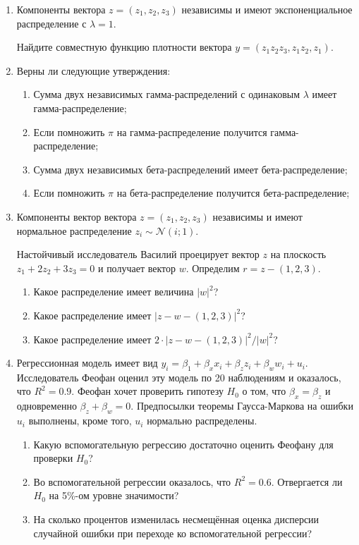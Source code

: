 \documentclass[12pt, a4paper]{article}
\def \cN{\mathcal{N}}
\begin{document}
\begin{enumerate}
\item Компоненты вектора $z= (z_1, z_2, z_3)$ независимы и имеют экспоненциальное распределение с $\lambda = 1$.

Найдите совместную функцию плотности вектора $y = (z_1z_2z_3, z_1z_2, z_1)$.

\item Верны ли следующие утверждения:

\begin{enumerate}
  \item Сумма двух независимых гамма-распределений с одинаковым $\lambda$ имеет гамма-распределение;
  \item Если помножить $\pi$ на гамма-распределение получится гамма-распределение;
  \item Сумма двух независимых бета-распределений  имеет бета-распределение;
  \item Если помножить $\pi$ на бета-распределение получится бета-распределение;
\end{enumerate}

\item Компоненты вектор вектора $z= (z_1, z_2, z_3)$ независимы и имеют нормальное распределение $z_i \sim \cN(i; 1)$.

Настойчивый исследователь Василий проецирует вектор $z$ на плоскость $z_1 + 2z_2 +3z_3 =0$ и получает вектор $w$. Определим $r = z - (1, 2, 3)$.

\begin{enumerate}
  \item Какое распределение имеет величина $|w|^2$?
  \item Какое распределение имеет $|z - w - (1, 2, 3)|^2$?
  \item Какое распределение имеет $2\cdot |z - w - (1, 2, 3)|^2 / |w|^2$?
\end{enumerate}

\newpage
\item Регрессионная модель имеет вид $y_i= \beta_1+ \beta_x x_{i}+ \beta_z z_{i}+ \beta_w w_{i}+u_i$. Исследователь Феофан оценил эту модель по 20 наблюдениям и оказалось, что $R^2=0.9$. Феофан хочет проверить гипотезу $H_0$ о том, что $\beta_x = \beta_z$ и одновременно $\beta_z + \beta_w = 0$. Предпосылки теоремы Гаусса-Маркова на ошибки $u_i$ выполнены, кроме того, $u_i$ нормально распределены.

\begin{enumerate}
\item Какую вспомогательную регрессию достаточно оценить Феофану для проверки $H_0$?
\item Во вспомогательной регрессии оказалось, что $R^2 = 0.6$. Отвергается ли $H_0$ на 5\%-ом уровне значимости?
\item На сколько процентов изменилась несмещённая оценка дисперсии случайной ошибки при переходе ко вспомогательной регрессии?
\end{enumerate}



\end{enumerate}
\end{document}
